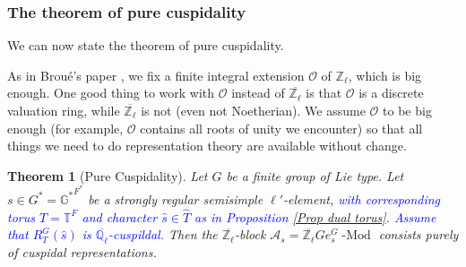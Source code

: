 \documentclass{article}
\newcommand{\blue}[1]{\textcolor{blue}{#1}}
\newtheorem{theorem}{Theorem}
\newcommand{\Modl}{\operatorname{-Mod}}
\begin{document}
	
	
	\subsubsection{The theorem of pure cuspidality}
	
	We can now state the theorem of pure cuspidality. 
	
	As in Broué's paper \cite{broue1990isometries}, we fix a finite integral extension $\mathcal{O}$ of $\mathbb{Z}_{\ell}$, which is big enough. One good thing to work with $\mathcal{O}$ instead of $\overline{\mathbb{Z}_{\ell}}$ is that $\mathcal{O}$ is a discrete valuation ring, while $\overline{\mathbb{Z}_{\ell}}$ is not (even not Noetherian). We assume $\mathcal{O}$ to be big enough (for example, $\mathcal{O}$ contains all roots of unity we encounter) so that all things we need to do representation theory are available without change.
	
	\begin{theorem}[Pure Cuspidality]\label{Pure Cuspidality}
		Let $G$ be a finite group of Lie type. Let $s \in G^*=\mathbb{G^*}^{F^*}$ be a strongly regular semisimple $\ell'$-element, \blue{with corresponding torus $T=\mathbb{T}^F$ and character $\hat{s} \in \hat{T}$ as in Proposition \ref{Prop dual torus}}. \blue{Assume that $R_T^G(\hat{s})$ is $\overline{\mathbb{Q}_{\ell}}$-cuspildal.} Then the $\overline{\mathbb{Z}_{\ell}}$-block $\mathcal{A}_s=\overline{\mathbb{Z}_{\ell}}Ge_s^G\Modl$ consists purely of cuspidal representations.
	\end{theorem}
	
\end{document}
